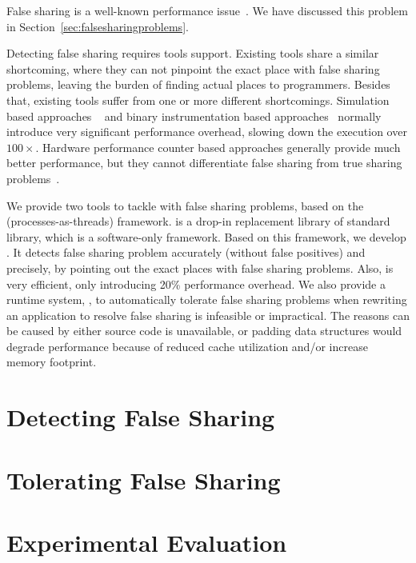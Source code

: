 \label{chapter:sherifftools}

False sharing is a well-known performance issue~\cite{falseshare:Analysis, falseshare:effect}. We have discussed this problem in Section~\ref{sec:falsesharingproblems}. 

Detecting false sharing requires tools support. Existing tools share a similar shortcoming, where they can not pinpoint the exact place with false sharing problems, leaving the burden of finding actual places to programmers. Besides that, existing tools suffer from one or more different shortcomings.  Simulation based approaches ~\cite{falseshare:simulator} and binary instrumentation based approaches~\cite{falseshare:binaryinstrumentation1, falseshare:binaryinstrumentation2} normally introduce very significant performance overhead, slowing down the execution over $100\times$. Hardware performance counter based approaches generally provide much better performance, but they cannot differentiate false sharing from true sharing problems~\cite{detect:ptu, detect:intel}.

We provide two tools to tackle with false sharing problems, based on the \sheriff{} (processes-as-threads) framework. \Sheriff{} is a drop-in replacement library  of standard \pthreads{} library, which is a software-only framework. Based on this framework, we develop \SheriffDetect{}. It detects false sharing problem accurately (without false positives) and precisely, by pointing out the exact places with false sharing problems. Also, \SheriffDetect{} is very efficient, only introducing 20\% performance overhead. We also provide a runtime system, \SheriffProtect{}, to automatically tolerate false sharing problems when rewriting an application to resolve false sharing is infeasible or impractical. The reasons can be caused by either source code is unavailable, or padding data structures would degrade performance because of reduced cache utilization and/or increase memory footprint.


%

\section{Detecting False Sharing}


\section{Tolerating False Sharing}


\section{Experimental Evaluation}

